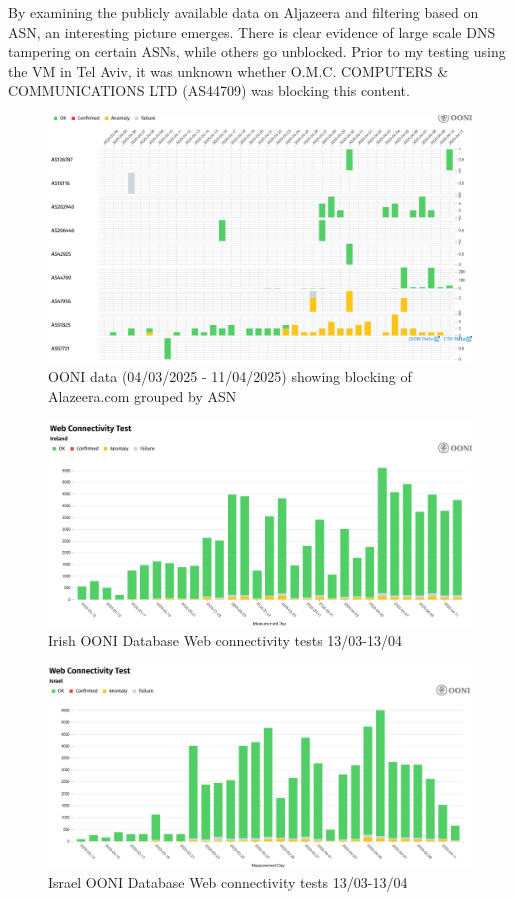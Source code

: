 By examining the publicly available data on Aljazeera and filtering based on ASN, an interesting picture emerges. There is clear evidence of large scale DNS tampering on certain ASNs, while others go unblocked. Prior to my testing using the VM in Tel Aviv, it was unknown whether O.M.C. COMPUTERS \& COMMUNICATIONS LTD (AS44709) was blocking this content. 

\begin{figure} [H]
    \centering
    \includegraphics[width=1\linewidth]{ALJZRbyASN.png}
    \caption{OONI data (04/03/2025 - 11/04/2025) showing blocking of Alazeera.com grouped by ASN}
    \label{fig:enter-label}
\end{figure}

\begin{figure} [H]
    \centering
    \includegraphics[width=1\linewidth]{IREWEBSOONIDB.png}
    \caption{Irish OONI Database Web connectivity tests 13/03-13/04}
    \label{fig:enter-label}
\end{figure}

\begin{figure} [H]
    \centering
    \includegraphics[width=1\linewidth]{ISRWEBSOONIDB.png}
    \caption{Israel OONI Database Web connectivity tests 13/03-13/04}
    \label{fig:enter-label}
\end{figure}


